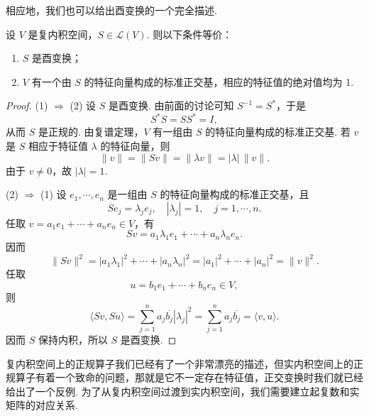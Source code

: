 相应地，我们也可以给出酉变换的一个完全描述.

\begin{theorem}{}{}
    设 $ V $ 是复内积空间，$ S \in \mathcal{L}(V) $. 则以下条件等价：
    \begin{enumerate}
        \item $ S $ 是酉变换；

        \item $ V $ 有一个由 $ S $ 的特征向量构成的标准正交基，相应的特征值的绝对值均为 1.
    \end{enumerate}
\end{theorem}

\begin{proof}
    (1) $ \Rightarrow $ (2) 设 $ S $ 是酉变换. 由前面的讨论可知 $ S^{-1} = S^* $，于是
    \[
        S^* S = S S^* = I,
    \]
    从而 $ S $ 是正规的. 由复谱定理，$ V $ 有一组由 $ S $ 的特征向量构成的标准正交基. 若 $ v $ 是 $ S $ 相应于特征值 $ \lambda $ 的特征向量，则
    \[
        \| v \| = \| Sv \| = \| \lambda v \| = |\lambda| \, \| v \|.
    \]
    由于 $ v \neq 0 $，故 $ |\lambda| = 1 $.

    (2) $ \Rightarrow $ (1) 设 $ e_1, \cdots, e_n $ 是一组由 $ S $ 的特征向量构成的标准正交基，且
    \[
        S e_j = \lambda_j e_j, \quad |\lambda_j| = 1, \quad j = 1, \cdots, n.
    \]
    任取 $v = a_1 e_1 + \cdots + a_n e_n \in V$，有
    \[
        Sv = a_1 \lambda_1 e_1 + \cdots + a_n \lambda_n e_n.
    \]
    因而
    \[
        \| Sv \|^2 = |a_1 \lambda_1|^2 + \cdots + |a_n \lambda_n|^2 = |a_1|^2 + \cdots + |a_n|^2 = \| v \|^2.
    \]
    任取
    \[
        u = b_1 e_1 + \cdots + b_n e_n \in V,
    \]
    则
    \[
        \langle Sv, Su \rangle = \sum_{j = 1}^n a_j \overline{b_j} |\lambda_j|^2 = \sum_{j = 1}^n a_j \overline{b_j} = \langle v, u \rangle.
    \]
    因而 $ S $ 保持内积，所以 $ S $ 是酉变换.
\end{proof}

复内积空间上的正规算子我们已经有了一个非常漂亮的描述，但实内积空间上的正规算子有着一个致命的问题，那就是它不一定存在特征值，正交变换时我们就已经给出了一个反例. 为了从复内积空间过渡到实内积空间，我们需要建立起复数和实矩阵的对应关系.



